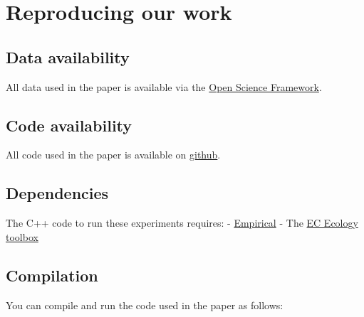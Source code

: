 \documentclass[]{book}
\begin{document}
\hypertarget{reproducing-our-work}{%
\section{Reproducing our work}\label{reproducing-our-work}}

\hypertarget{data-availability}{%
\subsection{Data availability}\label{data-availability}}

All data used in the paper is available via the \href{https://osf.io/6rndg/}{Open Science Framework}.

\hypertarget{code-availability}{%
\subsection{Code availability}\label{code-availability}}

All code used in the paper is available on \href{https://github.com/emilydolson/phylodiversity-metrics-in-EC-GPTP-2021/}{github}.

\hypertarget{dependencies}{%
\subsection{Dependencies}\label{dependencies}}

The C++ code to run these experiments requires:
- \href{https://github.com/devosoft/Empirical}{Empirical}
- The \href{https://github.com/emilydolson/ec_ecology_toolbox}{EC Ecology toolbox}

\hypertarget{compilation}{%
\subsection{Compilation}\label{compilation}}

You can compile and run the code used in the paper as follows:
\end{document}
